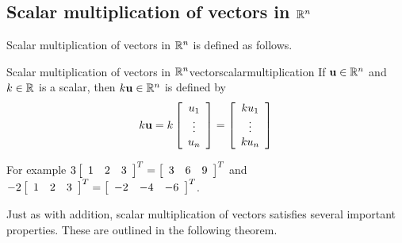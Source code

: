 \subsection{Scalar multiplication of vectors in \texorpdfstring{$\mathbb{R}^n$}{Rn}}

Scalar multiplication of vectors in $\mathbb{R}^n$ is defined as 
follows.

\begin{definition}{Scalar multiplication of vectors in $\mathbb{R}^n$}{vectorscalarmultiplication}
If ${\bf u}\in \mathbb{R}^{n}$ and $k\in \mathbb{R}$ is a
scalar, then $k{\bf u}\in \mathbb{R}^{n}$ is defined by
\begin{equation*}
k{\bf u}=k\left[ \begin{array}{c}
u_{1} \\
\vdots \\
u_{n}
\end{array}
\right] = \left[ \begin{array}{c}
ku_{1} \\
\vdots \\
ku_{n}
\end{array}
\right]
\end{equation*}
\end{definition}

For example 
$3 \left[
\begin{array}{rrr}
1 & 2 & 3
\end{array}
\right]^T =
\left[
\begin{array}{rrr}
3 & 6 & 9
\end{array}
\right]^T$
 and 
$-2\left[
\begin{array}{rrr}
1 & 2 & 3
\end{array}
\right]^T
=
\left[
\begin{array}{rrr}
-2 & -4 & -6
\end{array}
\right]^T$.

Just as with addition, scalar multiplication of vectors satisfies several important properties. These are 
outlined in the following theorem. 


